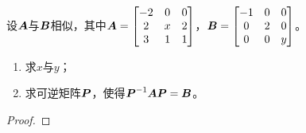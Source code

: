 \begin{problem}
设\(\boldsymbol{A}\)与\(\boldsymbol{B}\)相似，其中\(\boldsymbol{A}=\begin{bmatrix}-2&0&0\\2&x&2\\3&1&1\end{bmatrix}\)，\(\boldsymbol{B}=\begin{bmatrix}-1&0&0\\0&2&0\\0&0&y\end{bmatrix}\)。
\begin{enumerate}
    \item 求\(x\)与\(y\)；
    \item 求可逆矩阵\(\boldsymbol{P}\)，使得\({\boldsymbol{P}}^{-1}\boldsymbol{A}\boldsymbol{P}=\boldsymbol{B}\)。
\end{enumerate}
\end{problem}
\begin{proof}
\end{proof}


